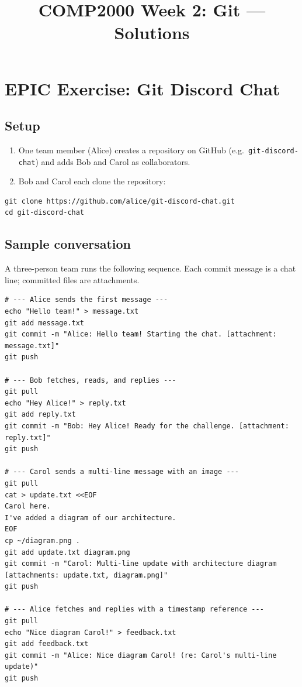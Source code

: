 \documentclass[twoside=false,DIV=14]{scrartcl}
\title{\color{redish} \vspace{-1em}COMP2000 Week 2: Git --- Solutions}
\begin{document}
{\color{blackish}\maketitle}\vspace{-7em}

\section*{EPIC Exercise: Git Discord Chat}

\subsection*{Setup}

\begin{enumerate}
    \item One team member (Alice) creates a repository on GitHub (e.g.\ \texttt{git-discord-chat}) and adds Bob and Carol as collaborators.
    \item Bob and Carol each clone the repository:
\end{enumerate}

\begin{lstlisting}
git clone https://github.com/alice/git-discord-chat.git
cd git-discord-chat
\end{lstlisting}

\subsection*{Sample conversation}

A three-person team runs the following sequence.  Each commit message is a chat line; committed files are attachments.

\begin{lstlisting}
# --- Alice sends the first message ---
echo "Hello team!" > message.txt
git add message.txt
git commit -m "Alice: Hello team! Starting the chat. [attachment: message.txt]"
git push

# --- Bob fetches, reads, and replies ---
git pull
echo "Hey Alice!" > reply.txt
git add reply.txt
git commit -m "Bob: Hey Alice! Ready for the challenge. [attachment: reply.txt]"
git push

# --- Carol sends a multi-line message with an image ---
git pull
cat > update.txt <<EOF
Carol here.
I've added a diagram of our architecture.
EOF
cp ~/diagram.png .
git add update.txt diagram.png
git commit -m "Carol: Multi-line update with architecture diagram [attachments: update.txt, diagram.png]"
git push

# --- Alice fetches and replies with a timestamp reference ---
git pull
echo "Nice diagram Carol!" > feedback.txt
git add feedback.txt
git commit -m "Alice: Nice diagram Carol! (re: Carol's multi-line update)"
git push
\end{lstlisting}
\end{document}
